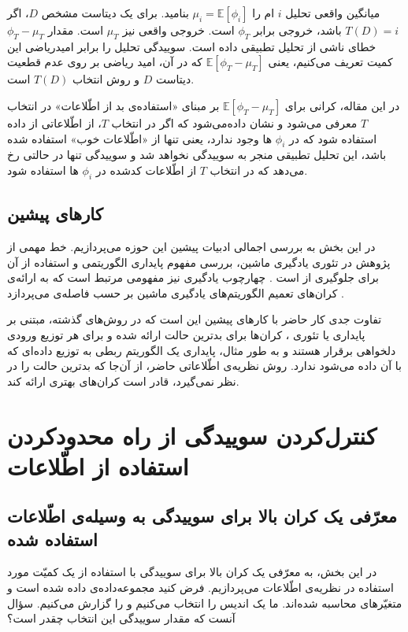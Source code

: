 \documentclass[a4paper,12pt]{article}
\newcommand{\E}{\mathbb{E}}
\begin{document}
	
	میانگین واقعی تحلیل 
	$i$
	ام را 
	$\mu_i = \E[\phi_i]$
	بنامید. برای یک دیتاست مشخص 
	$D$،
	اگر 
	$T(D) = i$
	باشد، خروجی برابر
	$\phi_T$
	است. خروجی واقعی نیز
	$\mu_T$
	است. مقدار
	$\phi_T - \mu_T$
	خطای ناشی از تحلیل تطبیقی داده است. سوییدگی تحلیل را برابر امیدریاضی این کمیت تعریف می‌کنیم، یعنی
	$\E[\phi_T - \mu_T]$
	که در آن، امید ریاضی بر روی عدم قطعیت دیتاست 
	$D$
	و روش انتخاب 
	$T(D)$
	است.
	
	در این مقاله، کرانی برای 
	$\E[\phi_T - \mu_T]$
	بر مبنای  «استفاده‌ی بد از اطّلاعات» در انتخاب 
	$T$
	معرفی می‌شود و نشان داده‌می‌شود که اگر در انتخاب 
	$T$،
	از اطّلاعاتی از داده استفاده شود که در 
	$\phi_i$
	ها وجود ندارد، یعنی تنها از «اطّلاعات خوب»  استفاده شده باشد، این تحلیل تطبیقی منجر به سوییدگی نخواهد شد و سوییدگی تنها در حالتی رخ می‌دهد که در انتخاب 
	$T$
	از اطّلاعات کدشده در 
	$\phi_i$
	ها استفاده شود.
	\subsection{کار‌های پیشین}
	در این بخش به بررسی اجمالی ادبیات پیشین این حوزه می‌پردازیم. خط مهمی از پژوهش در تئوری یادگیری ماشین، بررسی مفهوم پایداری الگوریتمی و استفاده از آن برای جلوگیری از 
	است
	\cite{bousquet2002stability, poggio2004general, shalev2010learnability}.
	چهارچوب یادگیری
	نیز مفهومی مرتبط است که به ارائه‌ی کران‌های تعمیم الگوریتم‌های یادگیری ماشین بر حسب فاصله‌ی
	می‌پردازد
	\cite{mcallester2013pac}.
	
	تفاوت جدی کار‌ حاضر با کار‌های پیشین این است که در روش‌های گذشته، مبتنی بر پایداری یا تئوری
	،
	کران‌ها برای بد‌ترین حالت ارائه شده و برای هر توزیع ورودی دلخواهی برقرار هستند و به طور مثال، پایداری یک الگوریتم ربطی به توزیع داده‌ای که با آن داده  می‌شود ندارد. روش نظریه‌ی اطّلاعاتی حاضر، از آن‌جا که بدترین حالت را در نظر نمی‌گیرد، قادر است کران‌های بهتری ارائه کند.
	
	
	\section{کنترل‌کردن سوییدگی از راه محدودکردن استفاده از اطّلاعات}\label{bias_control}
	\subsection{معرّفی یک کران بالا برای سوییدگی به وسیله‌ی اطّلاعات استفاده‌ شده}
	در این بخش، به معرّفی یک کران بالا برای سوییدگی با استفاده از یک کمیّت مورد استفاده در نظریه‌ی اطّلاعات می‌پردازیم. فرض کنید مجموعه‌داده‌ی
	داده شده است و متغیّرهای
	محاسبه شده‌اند. ما یک اندیس
	را انتخاب می‌کنیم و 
	را گزارش می‌کنیم. سؤال آنست که مقدار سوییدگی این انتخاب
	\lr{$(\phi_T(D) - \E[\phi_T(D)])$}
	چقدر است؟
	
\end{document}
